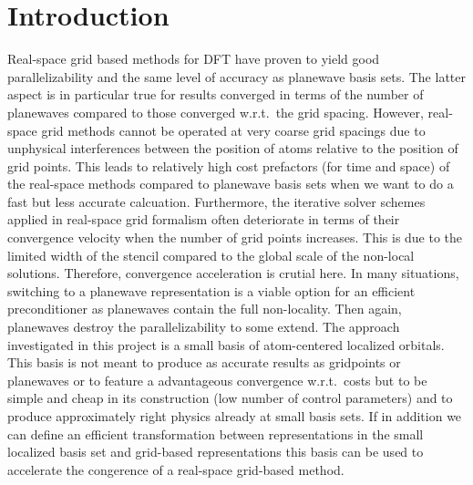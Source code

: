 \documentclass[oribibl]{llncs}
\begin{document}
\section{Introduction} \label{sec:intro}
%
Real-space grid based methods for \ac{DFT}
have proven to yield good parallelizability and the same level of
accuracy as \ac{planewave} basis sets.
The latter aspect is in particular true for results converged
in terms of the number of \acp{planewave} compared to those converged
w.r.t.~the grid spacing.
However, real-space grid methods cannot be operated at very coarse
grid spacings due to unphysical interferences between the position
of atoms relative to the position of grid points.
This leads to relatively high cost prefactors (for time and space)
of the real-space methods compared to \ac{planewave} basis sets
when we want to do a fast but less accurate calcuation.
Furthermore, the iterative solver schemes applied in real-space
grid formalism often deteriorate in terms of their convergence
velocity when the number of grid points increases.
This is due to the limited width of the stencil compared to the 
global scale of the non-local solutions.
Therefore, convergence acceleration is crutial here.
In many situations, switching to a \ac{planewave} representation
is a viable option for an efficient preconditioner as
\acp{planewave} contain the full non-locality.
Then again, \acp{planewave} destroy the parallelizability
to some extend.
The approach investigated in this project is a small basis of atom-centered
localized orbitals.
This basis is not meant to produce as accurate results as \acp{gridpoint} or \acp{planewave}
or to feature a advantageous convergence w.r.t.~costs
but to be simple and cheap in its construction (low number of control parameters)
and to produce approximately right physics already at small basis sets.
If in addition we can define an efficient transformation between
representations in
the small localized basis set and grid-based representations
this basis can be used to accelerate
the congerence of a real-space grid-based method.

\end{document}
